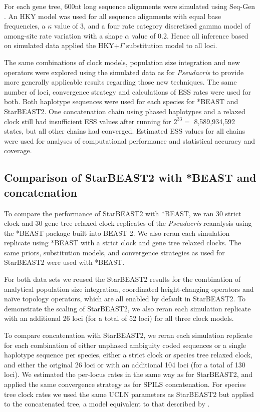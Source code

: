\documentclass[12pt]{article}
\begin{document}
For each gene tree, 600nt long sequence alignments were simulated using Seq-Gen \citep{Rambaut01061997}. An HKY model was used for all sequence alignments
with equal base frequencies, a $\kappa$ value of 3, and a four rate category
discretised gamma model of among-site rate variation with a shape $\alpha$
value of 0.2. Hence all inference based on simulated data applied the HKY+$\Gamma$
substitution model to all loci.

The same combinations of clock models, population size integration and new
operators were explored using the simulated data as for \textit{Pseudacris} to
provide more generally applicable results regarding those new techniques. The
same number of loci, convergence strategy and calculations of ESS rates were
used for both. Both haplotype sequences were used for each species for *BEAST
and StarBEAST2. One concatenation chain using phased haplotypes and a relaxed
clock still had insufficient ESS values after running for $2^{33} =$
8,589,934,592 states, but all other chains had converged. Estimated ESS
values for all chains were used for analyses of computational performance and
statistical accuracy and coverage.

\subsection{Comparison of StarBEAST2 with *BEAST and concatenation}

To compare the performance of StarBEAST2 with *BEAST, we ran 30 strict clock
and 30 gene tree relaxed clock replicates of the \textit{Pseudacris}
reanalysis using the *BEAST package built into BEAST 2. We also reran each
simulation replicate using *BEAST with a strict clock and gene tree relaxed
clocks. The same priors, substitution models, and convergence strategies as
used for StarBEAST2 were used with *BEAST.

For both data sets we reused the StarBEAST2 results for the combination of
analytical population size integration, coordinated height-changing operators
and na\"ive topology operators, which are all enabled by default in
StarBEAST2. To demonstrate the scaling of StarBEAST2, we also reran each
simulation replicate with an additional 26 loci (for a total of 52 loci) for
all three clock models.

To compare concatenation with StarBEAST2, we reran each simulation replicate
for each combination of either unphased ambiguity coded sequences or a single
haplotype sequence per species, either a strict clock or species tree relaxed
clock, and either the original 26 loci or with an additional 104 loci (for a
total of 130 loci). We estimated the per-locus rates in the same way as for
StarBEAST2, and applied the same convergence strategy as for SPILS
concatenation. For species tree clock rates we used the same UCLN parameters
as StarBEAST2 but applied to the concatenated tree, a model equivalent to that
described by \cite{Rasmussen01122007}.
\end{document}
